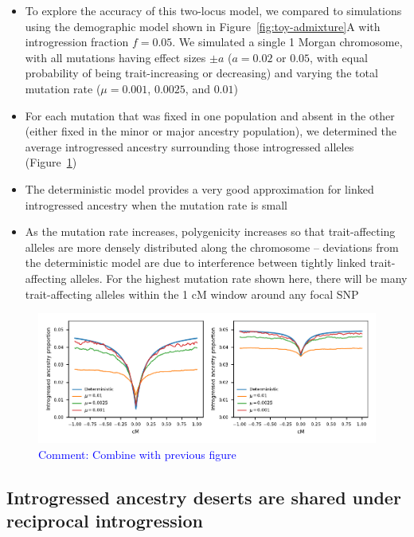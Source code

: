 \documentclass{article}
\newcommand{\aprcomment}[1]{{\textcolor{blue}{Comment: #1}}}
\begin{document}
\begin{itemize}
    \item To explore the accuracy of this two-locus model, we compared to
        simulations using the demographic model shown in
        Figure~\ref{fig:toy-admixture}A with introgression fraction $f=0.05$.
        We simulated a single 1 Morgan
        chromosome, with all mutations having effect sizes $\pm a$ ($a=0.02$ or
        $0.05$, with equal probability of being trait-increasing or decreasing)
        and varying the total mutation rate ($\mu=0.001$, $0.0025$, and $0.01$)
    \item For each mutation that was fixed in one population and absent in the
        other (either fixed in the minor or major ancestry population), we
        determined the average introgressed ancestry surrounding those introgressed
        alleles (Figure~\ref{fig:linkage-sim})
    \item The deterministic model provides a very good approximation for linked
        introgressed ancestry when the mutation rate is small
    \item As the mutation rate increases, polygenicity increases so that
        trait-affecting alleles are more densely distributed along the chromosome --
        deviations from the deterministic model are due to interference between
        tightly linked trait-affecting alleles. For the highest mutation rate shown
        here, there will be many trait-affecting alleles within the 1 cM window
        around any focal SNP
\end{itemize}

\begin{figure}[t!]
    \centering
    \includegraphics{../figures/linkage_simulation.pdf}
    \caption{
        \textbf{}
        \aprcomment{Combine with previous figure}
    }
    \label{fig:linkage-sim}
\end{figure}

\subsection*{Introgressed ancestry deserts are shared under reciprocal introgression}
\end{document}

